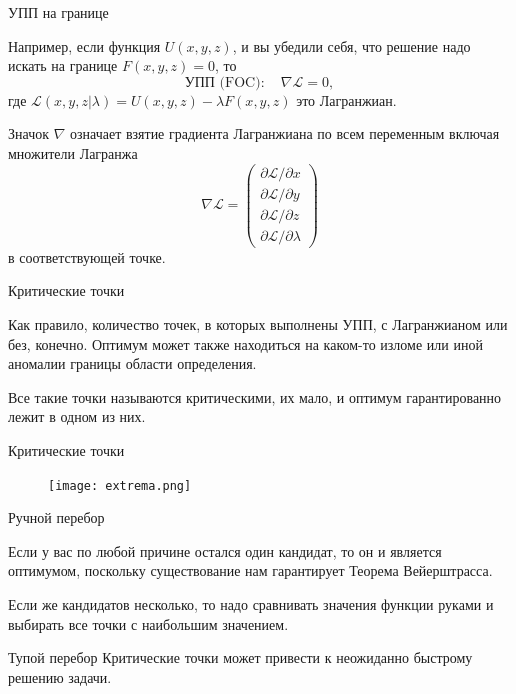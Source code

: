\documentclass{beamer}
\begin{document}
\begin{frame}{УПП на границе}

Например, если функция $U(x, y, z)$, и вы убедили себя, что решение надо искать на границе $F(x,y,z) = 0$, то
$$\text{УПП (FOC)}: \quad  \nabla \mathcal{L} = 0, $$ 
где $\mathcal{L}(x,y,z|\lambda) = U(x, y, z) - \lambda F(x,y,z)$ это \alert{Лагранжиан}.

Значок $\nabla$ означает взятие градиента Лагранжиана по всем переменным включая множители Лагранжа $$ \nabla \mathcal{L} = \begin{pmatrix} \partial \mathcal{L}/\partial x \\ \partial \mathcal{L}/\partial y \\ \partial \mathcal{L}/\partial z \\ \partial \mathcal{L}/\partial \lambda \end{pmatrix}$$
в соответствующей точке.

\end{frame}


\begin{frame}{Критические точки}

Как правило, количество точек, в которых выполнены УПП, с Лагранжианом или без,  конечно. Оптимум может также находиться на каком-то изломе или иной аномалии границы области определения.

Все такие точки называются \alert{критическими}, их мало, и оптимум гарантированно лежит в одном из них. 

\end{frame}

\begin{frame}{Критические точки}

\begin{figure}[hbt]
\centering
\texttt{[image: extrema.png]}
\end{figure}

\end{frame}

\begin{frame}{Ручной перебор}

Если у вас по любой причине остался один кандидат, то он и является оптимумом, поскольку существование нам гарантирует Теорема Вейерштрасса. 

Если же кандидатов несколько, то надо сравнивать значения функции руками и выбирать все точки с наибольшим значением. 

Тупой перебор Критические точки может привести к неожиданно быстрому решению задачи.

\end{frame}
\end{document}
